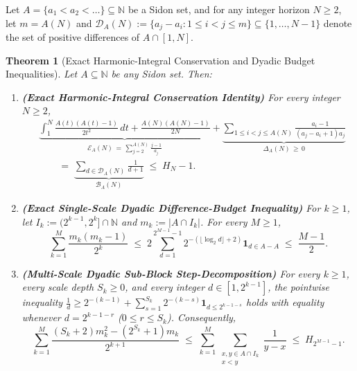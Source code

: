 \documentclass[11pt,reqno]{amsart}
\newtheorem{theorem}{Theorem}[section]
\theoremstyle{definition}
\theoremstyle{remark}
\begin{document}
Let $A = \{a_1 < a_2 < \dots\} \subseteq \mathbb{N}$ be a Sidon set, and for any integer horizon $N \ge 2$, let $m = A(N)$ and $\mathcal{D}_A(N) := \{a_j - a_i : 1 \le i < j \le m\} \subseteq \{1, \dots, N-1\}$ denote the set of positive differences of $A \cap [1, N]$.

\begin{theorem}[Exact Harmonic-Integral Conservation and Dyadic Budget Inequalities]\label{thm:conservation}
Let $A \subseteq \mathbb{N}$ be any Sidon set. Then:
\begin{enumerate}
  \item[\textup{(a)}] \textbf{(Exact Harmonic-Integral Conservation Identity)} For every integer $N \ge 2$,
  \begin{equation}\label{eq:harmonic_conservation}
    \begin{aligned}
      &\underbrace{\int_1^N \frac{A(t)(A(t) - 1)}{2 t^2}\,dt + \frac{A(N)(A(N) - 1)}{2 N}}_{\mathcal{E}_A(N) \,=\, \sum_{j=2}^{A(N)} \frac{j-1}{a_j}} + \underbrace{\sum_{1 \le i < j \le A(N)} \frac{a_i - 1}{(a_j - a_i + 1) a_j}}_{\Delta_A(N) \,\ge\, 0} \\
      &\qquad =\; \underbrace{\sum_{d \in \mathcal{D}_A(N)} \frac{1}{d + 1}}_{\mathcal{B}_A(N)} \;\le\; H_N - 1.
    \end{aligned}
  \end{equation}
  \item[\textup{(b)}] \textbf{(Exact Single-Scale Dyadic Difference-Budget Inequality)} For $k \ge 1$, let $I_k := (2^{k-1}, 2^k] \cap \mathbb{N}$ and $m_k := |A \cap I_k|$. For every $M \ge 1$,
  \begin{equation}\label{eq:dyadic_budget}
    \sum_{k=1}^M \frac{m_k(m_k - 1)}{2^k} \;\le\; 2 \sum_{d=1}^{2^{M-1}-1} 2^{-(\lfloor \log_2 d \rfloor + 2)} \mathbf{1}_{d \in A - A} \;\le\; \frac{M - 1}{2}.
  \end{equation}
  \item[\textup{(c)}] \textbf{(Multi-Scale Dyadic Sub-Block Step-Decomposition)} For every $k \ge 1$, every scale depth $S_k \ge 0$, and every integer $d \in [1, 2^{k-1}]$, the pointwise inequality $\frac{1}{d} \ge 2^{-(k-1)} + \sum_{s=1}^{S_k} 2^{-(k-s)} \mathbf{1}_{d \le 2^{k-1-s}}$ holds with equality whenever $d = 2^{k-1-r}$ ($0 \le r \le S_k$). Consequently,
  \begin{equation}\label{eq:multiscale_budget}
    \sum_{k=1}^M \frac{(S_k + 2) m_k^2 - (2^{S_k} + 1) m_k}{2^{k+1}} \;\le\; \sum_{k=1}^M \sum_{\substack{x, y \in A \cap I_k \\ x < y}} \frac{1}{y - x} \;\le\; H_{2^{M-1}-1}.
  \end{equation}
\end{enumerate}
\end{theorem}
\end{document}

